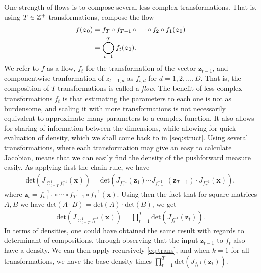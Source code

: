 One strength of flows is to compose several less complex transformations. That is, using
\(T \in \mathbb{Z}^{+}\) transformations, compose the flow
\begin{align*}
    f(\bm z_0) &= f_T \circ f_{T-1} \circ \cdots \circ f_2 \circ f_1(\bm z_0)\\
               &= \bigcircop_{t=1}^T f_t(\bm z_0).
\end{align*}
We refer to \(f\) as a flow, \(f_t\) for the transformation of the vector
\(\bm z_{t-1}\), and componentwise tranformation of \(z_{t-1,d}\) as \(f_{t,d}\) for \(d = 1,2,\dots, D\).
That is, the composition of \(T\) transformations is called a \emph{flow}.
The benefit of less complex transformations \(f_t\) is that estimating the parameters to each one is not 
as burdensome, and scaling it with more transformations is not necessarily equivalent to approximate many 
parameters to a complex function. It also allows for sharing of information between the dimensions, while allowing for
quick evaluation of density, which we shall come back to in \cref{seq:struct}. Using several transformations, where
each transformation may give an easy to calculate Jacobian, means that we can easily find the density of the pushforward measure
easily. As applying first the chain rule, we have
\begin{align*}
    \text{det}\left(J_{\bigcirc_{t=T}^1 f_t^{-1}}(\bm x)\right)
    = \text{det}\left(J_{f^{-1}_1}(\bm z_{1})\cdots 
    J_{f^{-1}_{T-1}}(\bm z_{T-1}) \cdot J_{f^{-1}_T}(\bm x)\right),
\end{align*}
where \(\bm z_{t} = f^{-1}_{t+1} \circ \cdots \circ f^{-1}_{T-1} \circ f^{-1}_T(\bm x)\). Using then the fact that 
for square matrices \(A,B\) we have \(\text{det}\left(A\cdot B\right) = \text{det}(A) \cdot \text{det}(B)\), we get
\begin{align*}
    \text{det}\left(J_{\bigcirc_{t=T}^1 f_t^{-1}}(\bm x)\right)
    = \prod_{t=1}^T \text{det}\left(J_{f^{-1}_t}(\bm z_t)\right).
\end{align*}
In terms of densities, one could have obtained the same result with regards to determinant of compositions, through
observing that the input \(\bm z_{t-1}\) to \(f_t\) also have a density. We can then apply recursively \cref{eq:trans}, and
when \(k=1\) for all transformations, we have the base density times \(\prod_{t=1}^T \text{det}\left(J_{f^{-1}_t}(\bm z_t)\right)\).

